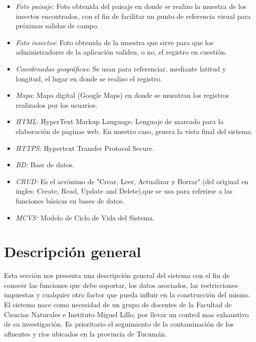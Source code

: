 \begin{itemize}
        \item \emph{Foto paisaje}: Foto obtenida del paisaje en donde se realizo la muestra de los insectos encontrados, con el fin de facilitar un punto de referencia visual para próximas salidas de campo.
        
        \item \emph{Foto insectos}: Foto obtenida de la muestra que sirve para que los administradores de la aplicación validen, o no, el registro en cuestión.
        
        \item \emph{Coordenadas geográficas}: Se usan para referenciar, mediante latitud y longitud, el lugar en donde se realizo el registro.
        
        \item \emph{Mapa}: Mapa digital (Google Maps) en donde se muestran los registros realizados por los usuarios.
        
        \item \emph{HTML:} HyperText Markup Language. Lenguaje de marcado para la elaboración de paginas web. En nuestro caso, genera la vista final del sistema.
        
        \item \emph{HTTPS:} Hypertext Transfer Protocol Secure.
        
        \item \emph{BD:} Base de datos.
        
        \item \emph{CRUD:} Es el acrónimo de "Crear, Leer, Actualizar y Borrar" (del original en ingles: Create, Read, Update and Delete),que se usa para referirse a las funciones básicas en bases de datos.
        
        \item \emph{MCVS:} Modelo de Ciclo de Vida del Sistema.
      \end{itemize}

  \section{Descripción general}

    Esta sección nos presenta una descripción general del sistema con el fin de conocer las funciones que debe soportar, los datos asociados, las restricciones impuestas y cualquier otro factor que pueda influir en la construcción del mismo.
    El sistema nace como necesidad de un grupo de docentes de la Facultad de Ciencias Naturales e Instituto Miguel Lillo, por llevar un control mas exhaustivo de su investigación.
    Es prioritario el seguimiento de la contaminación de los afluentes y ríos ubicados en la provincia de Tucumán.

